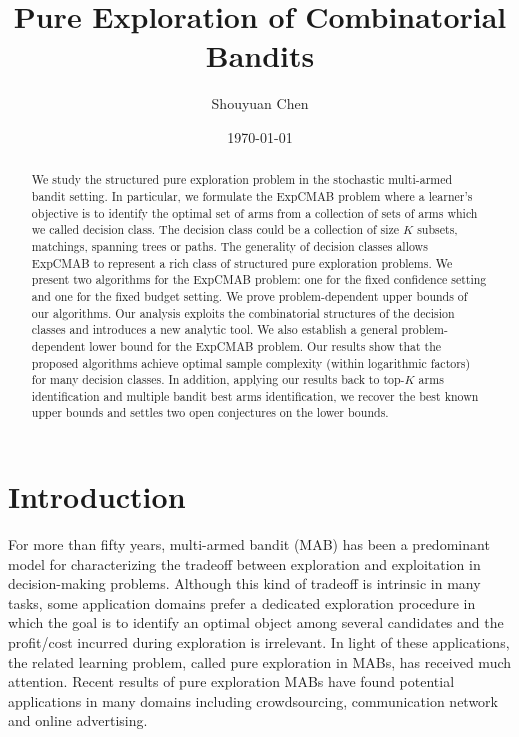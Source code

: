 \documentclass{article}
\title{Pure Exploration of Combinatorial Bandits}
\author{Shouyuan Chen}
\date{\today}
\newcommand{\Problem}{{\small \textsf{ExpCMAB}}\xspace}
\begin{document}
\newpage

\maketitle

\begin{abstract}
We study the structured pure exploration problem in the stochastic multi-armed bandit setting.
In particular, we formulate the \Problem problem where a learner's objective is to identify the optimal set of arms from a collection of sets of arms which we called decision class.
The decision class could be a collection of size $K$ subsets, matchings, spanning trees or paths. 
The generality of decision classes allows \Problem to represent a rich class of structured pure exploration problems.
We present two algorithms for the \Problem problem: one for the fixed confidence setting and one for the fixed budget setting.
We prove problem-dependent upper bounds of our algorithms. 
Our analysis exploits the combinatorial structures of the decision classes and introduces a new analytic tool.
We also establish a general problem-dependent lower bound for the \Problem problem.
Our results show that the proposed algorithms achieve optimal sample complexity (within logarithmic factors) for many decision classes. 
In addition, applying our results back to top-$K$ arms identification and multiple bandit best arms identification, we recover the best known upper bounds and settles two open conjectures on the lower bounds.



\end{abstract}

\section{Introduction}

For more than fifty years, multi-armed bandit (MAB) has been a predominant model for characterizing the tradeoff between exploration and exploitation in decision-making problems. 
Although this kind of tradeoff is intrinsic in many tasks, some application domains prefer a dedicated exploration procedure in which the goal is to identify an optimal object among several candidates and the profit/cost incurred during exploration is irrelevant.
In light of these applications, the related learning problem, called pure exploration in MABs, has received much attention.
Recent results of pure exploration MABs have found potential applications in many domains including crowdsourcing, communication network and online advertising.
\end{document}
